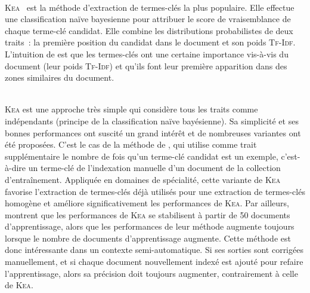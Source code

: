         ~\\\textsc{Kea}~\cite{witten1999kea} est la méthode d'extraction de
        termes-clés la plus populaire. Elle effectue une classification naïve
        bayesienne pour attribuer le score de vraisemblance de chaque terme-clé
        candidat. Elle combine les distributions probabilistes de deux traits~:
        la première position du candidat dans le document et son poids
        \textsc{Tf-Idf}. L'intuition de  est que les
        termes-clés ont une certaine importance vis-à-vis du document (leur
        poids \textsc{Tf-Idf}) et qu'ils font leur première apparition dans des
        zones similaires du document.

        ~\\\textsc{Kea} est une approche très simple qui considère tous les
        traits comme indépendants (principe de la classification naïve
        bayésienne). Sa simplicité et ses bonnes performances ont suscité un
        grand intérêt et de nombreuses variantes ont été proposées. C'est le cas
        de la méthode de , qui utilise comme
        trait supplémentaire le nombre de fois qu'un terme-clé candidat est un
        exemple, c'est-à-dire un terme-clé de l'indexation manuelle d'un
        document de la collection d'entraînement. Appliquée
        en domaines de spécialité, cette variante de \textsc{Kea} favorise
        l'extraction de termes-clés déjà utilisés pour une extraction de
        termes-clés homogène et améliore significativement les performances de
        \textsc{Kea}. Par ailleurs,  montrent que
        les performances de \textsc{Kea} se stabilisent à partir de 50 documents
        d'apprentissage, alors que les performances de leur méthode augmente
        toujours lorsque le nombre de documents d'apprentissage augmente. Cette
        méthode est donc intéressante dans un contexte semi-automatique. Si ses
        sorties sont corrigées manuellement,
        et si chaque document nouvellement indexé est ajouté pour refaire
        l'apprentissage, alors sa précision doit toujours augmenter, contrairement à
        celle de \textsc{Kea}.
        
